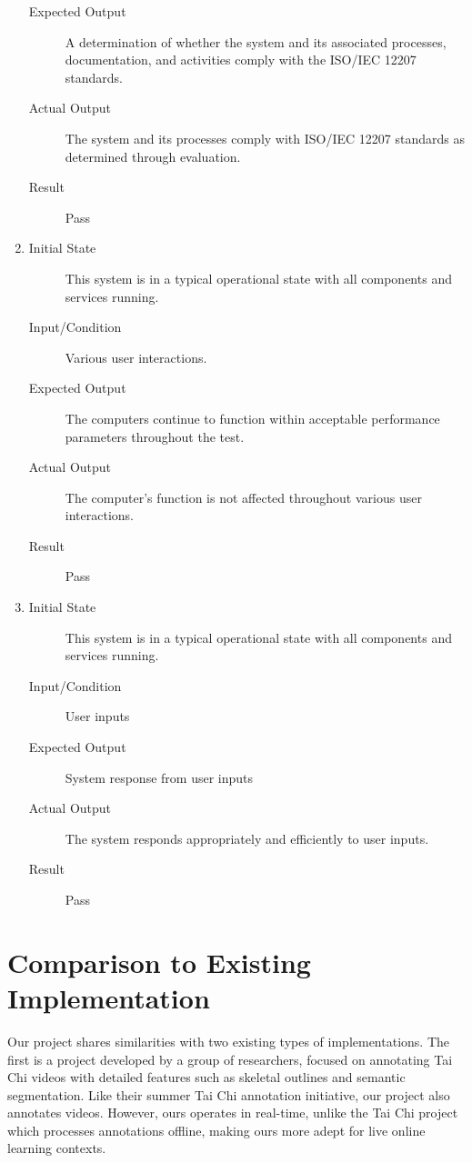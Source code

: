 \documentclass[12pt, titlepage]{article}
\begin{document}
\begin{enumerate}[NFR-T1]
\begin{description}
    \item[Expected Output] A determination of whether the system and its associated
      processes, documentation, and activities comply with the ISO/IEC 12207
      standards.
    \item[Actual Output] The system and its processes comply with ISO/IEC 12207
      standards as determined through evaluation.
    \item[Result] Pass
    \end{description}
  \item \label{NFRT29}
    \begin{description}
    \item[Initial State] This system is in a typical operational state with all
      components and services running.
    \item[Input/Condition] Various user interactions.
    \item[Expected Output] The computers continue to function within acceptable
      performance parameters throughout the test.
    \item[Actual Output] The computer's function is not affected throughout various
      user interactions.
    \item[Result] Pass
    \end{description}
  \item \label{NFRT30}
    \begin{description}
    \item[Initial State] This system is in a typical operational state with all
      components and services running.
    \item[Input/Condition] User inputs
    \item[Expected Output] System response from user inputs
    \item[Actual Output] The system responds appropriately and efficiently to user
      inputs.
    \item[Result] Pass
    \end{description}
  \end{enumerate}

\section{Comparison to Existing Implementation}

Our project shares similarities with two existing types of implementations. The
first is a project developed by a group of researchers, focused on annotating
Tai Chi videos with detailed features such as skeletal outlines and semantic
segmentation. Like their summer Tai Chi annotation initiative, our project also
annotates videos. However, ours operates in real-time, unlike the Tai Chi
project which processes annotations offline, making ours more adept for live
online learning contexts.
\end{document}
